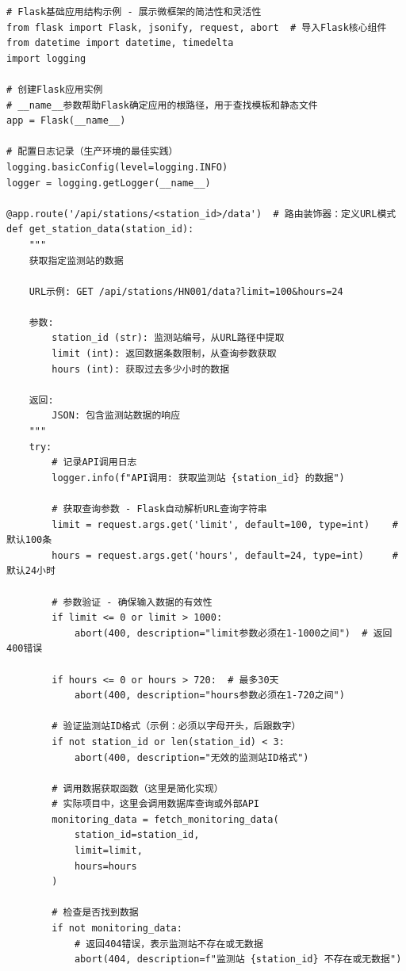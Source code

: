 \begin{lstlisting}[style=python]
# Flask基础应用结构示例 - 展示微框架的简洁性和灵活性
from flask import Flask, jsonify, request, abort  # 导入Flask核心组件
from datetime import datetime, timedelta
import logging

# 创建Flask应用实例
# __name__参数帮助Flask确定应用的根路径，用于查找模板和静态文件
app = Flask(__name__)

# 配置日志记录（生产环境的最佳实践）
logging.basicConfig(level=logging.INFO)
logger = logging.getLogger(__name__)

@app.route('/api/stations/<station_id>/data')  # 路由装饰器：定义URL模式
def get_station_data(station_id):
    """
    获取指定监测站的数据
    
    URL示例: GET /api/stations/HN001/data?limit=100&hours=24
    
    参数:
        station_id (str): 监测站编号，从URL路径中提取
        limit (int): 返回数据条数限制，从查询参数获取
        hours (int): 获取过去多少小时的数据
        
    返回:
        JSON: 包含监测站数据的响应
    """
    try:
        # 记录API调用日志
        logger.info(f"API调用: 获取监测站 {station_id} 的数据")
        
        # 获取查询参数 - Flask自动解析URL查询字符串
        limit = request.args.get('limit', default=100, type=int)    # 默认100条
        hours = request.args.get('hours', default=24, type=int)     # 默认24小时
        
        # 参数验证 - 确保输入数据的有效性
        if limit <= 0 or limit > 1000:
            abort(400, description="limit参数必须在1-1000之间")  # 返回400错误
            
        if hours <= 0 or hours > 720:  # 最多30天
            abort(400, description="hours参数必须在1-720之间")
        
        # 验证监测站ID格式（示例：必须以字母开头，后跟数字）
        if not station_id or len(station_id) < 3:
            abort(400, description="无效的监测站ID格式")
        
        # 调用数据获取函数（这里是简化实现）
        # 实际项目中，这里会调用数据库查询或外部API
        monitoring_data = fetch_monitoring_data(
            station_id=station_id, 
            limit=limit, 
            hours=hours
        )
        
        # 检查是否找到数据
        if not monitoring_data:
            # 返回404错误，表示监测站不存在或无数据
            abort(404, description=f"监测站 {station_id} 不存在或无数据")
        

\end{lstlisting}
